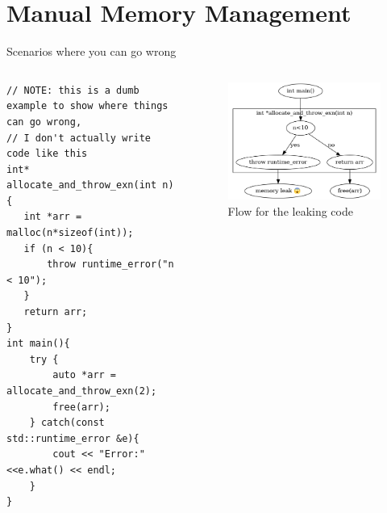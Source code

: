 \documentclass[
  10pt,
  ignorenonframetext,
]{beamer}
\begin{document}
\hypertarget{manual-memory-management}{%
\section{Manual Memory
Management}\label{manual-memory-management}}

\begin{frame}[fragile]{Scenarios where you can go
wrong}
\protect\hypertarget{scenarios-where-you-can-go-wrong}{}
\begin{columns}[T]
\begin{column}{0.48\textwidth}
\scriptsize

\begin{verbatim}
// NOTE: this is a dumb example to show where things can go wrong,
// I don't actually write code like this
int* allocate_and_throw_exn(int n){
   int *arr = malloc(n*sizeof(int));
   if (n < 10){
       throw runtime_error("n < 10");
   }
   return arr;
}
int main(){
    try {
        auto *arr = allocate_and_throw_exn(2);
        free(arr);
    } catch(const std::runtime_error &e){
        cout << "Error:" <<e.what() << endl;
    }
}
\end{verbatim}

\normalsize
\end{column}

\begin{column}{0.48\textwidth}
\vspace{30pt}

\pause

\begin{figure}
\centering
\includegraphics[width=1.15\textwidth,height=\textheight]{images/mem_management_leak_scenario1.png}
\caption{Flow for the leaking code}
\end{figure}
\end{column}
\end{columns}
\end{frame}
\end{document}
